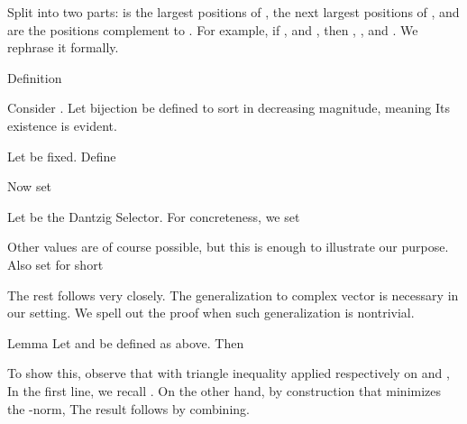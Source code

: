 \stopsection

\startsection [title={Expected Error Analysis for Complex-Case Dantzig Selector}]

Split  into two parts:  is the largest  positions of ,  the next  largest positions of , and  are the positions complement to .
For example, if , and , then , , and .
We rephrase it formally.

\Result
{Definition}
{
Consider .
Let bijection  be defined to sort  in decreasing magnitude, meaning
Its existence is evident.

Let  be fixed.
Define
}

Now set

Let  be the Dantzig Selector.
For concreteness, we set

Other values are of course possible, but this is enough to illustrate our purpose.
Also set for short


The rest follows  very closely.
The generalization to complex vector is necessary in our setting.
We spell out the proof when such generalization is nontrivial.

\Result
{Lemma}
{
Let  and  be defined as above.
Then
}

To show this, observe that with triangle inequality applied respectively on  and ,
In the first line, we recall .
On the other hand, by construction that  minimizes the -norm,
The result follows by combining.

